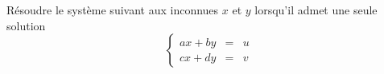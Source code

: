 R\'esoudre le syst\`eme suivant aux inconnues $x$ et $y$ lorsqu'il admet une seule solution
\begin{displaymath}
\left\lbrace \begin{array}{lcl}
ax+by & = & u \\ 
cx+dy & = & v
\end{array} \right. 
\end{displaymath}
\bigskip \bigskip